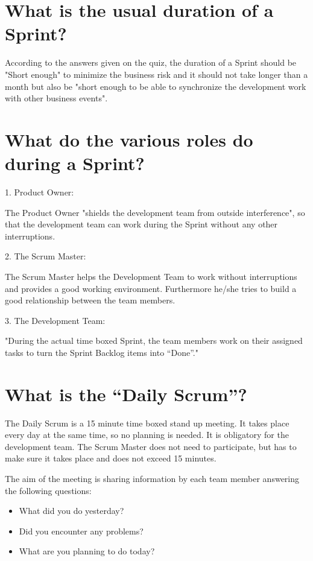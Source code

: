 \documentclass[a4paper, 12pt]{article}
\begin{document}
\section{What is the usual duration of a Sprint?}
According to the answers given on the quiz, the duration of a Sprint should be "Short enough" to minimize the business risk and it should not take longer than a month but also be "short enough to be able to synchronize the development work with other business events".
\cite{scrumorg}

\section{What do the various roles do during a Sprint?}

1. Product Owner:

The Product Owner "shields the development team from outside interference", so that the development team can work during the Sprint without any other interruptions. \cite{thoma3}
\bigskip

2. The Scrum Master:

The Scrum Master helps the Development Team to work without interruptions and provides a good working environment. Furthermore he/she tries to build a good relationship between the team members. \cite{thoma3}
\bigskip

3. The Development Team:

"During the actual time boxed Sprint, the team members work on their assigned tasks to turn the Sprint Backlog items into “Done”." \cite{thoma3}

\section{What is the “Daily Scrum”?}

The Daily Scrum is a 15 minute time boxed stand up meeting. It takes place every day at the same time, so no planning is needed. It is obligatory for the development team. The Scrum Master does not need to participate, but has to make sure it takes place and does not exceed 15 minutes.

The aim of the meeting is sharing information by each team member answering the following questions:
\begin{itemize}
        \item What did you do yesterday?
        \item Did you encounter any problems?
        \item What are you planning to do today?
    \end{itemize}
    
\end{document}
